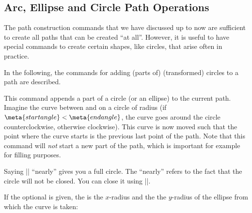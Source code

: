 \subsection{Arc, Ellipse and Circle Path Operations}

The path construction commands that we have discussed up to now are sufficient
to create all paths that can be created ``at all''. However, it is useful to
have special commands to create certain shapes, like circles, that arise often
in practice.

In the following, the commands for adding (parts of) (transformed) circles to a
path are described.

\begin{command}{\pgfpatharc{}}
    This command appends a part of a circle (or an ellipse) to the current
    path. Imagine the curve between  and  on
    a circle of radius  (if $\meta{start angle} < \meta{end
    angle}$, the curve goes around the circle counterclockwise, otherwise
    clockwise). This curve is now moved such that the point where the curve
    starts is the previous last point of the path. Note that this command will
    \emph{not} start a new part of the path, which is important for example for
    filling purposes.
\begin{codeexample}[]
\end{codeexample}

    Saying || ``nearly'' gives you a full circle. The
    ``nearly'' refers to the fact that the circle will not be closed. You can
    close it using |\pgfpathclose|.

    If the optional  is given, the  is the
    $x$-radius and the  the $y$-radius of the ellipse from which
    the curve is taken:
\begin{codeexample}[]
\end{codeexample}


\end{command}
